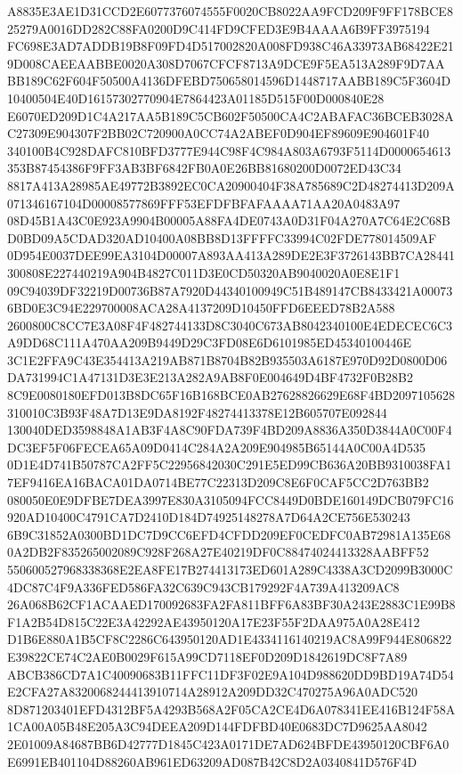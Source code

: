 \documentclass[UTF8,fontset=fandol,zihao=-4,a4paper]{ctexart}
\begin{document}
{{A8835E3AE1D31CCD2E6077376074555F0020CB8022AA9FCD209F9FF178BCE825279A0016DD282C88FA0200D9C414FD9CFED3E9B4AAAA6B9FF3975194
FC698E3AD7ADDB19B8F09FD4D517002820A008FD938C46A33973AB68422E219D008CAEEAABBE0020A308D7067CFCF8713A9DCE9F5EA513A289F9D7AA
BB189C62F604F50500A4136DFEBD750658014596D1448717AABB189C5F3604D10400504E40D16157302770904E7864423A01185D515F00D000840E28
E6070ED209D1C4A217AA5B189C5CB602F50500CA4C2ABAFAC36BCEB3028AC27309E904307F2BB02C720900A0CC74A2ABEF0D904EF89609E904601F40
340100B4C928DAFC810BFD3777E944C98F4C984A803A6793F5114D0000654613353B87454386F9FF3AB3BF6842FB0A0E26BB81680200D0072ED43C34
8817A413A28985AE49772B3892EC0CA20900404F38A785689C2D48274413D209A071346167104D00008577869FFF53EFDFBFAFAAAA71AA20A0483A97
08D45B1A43C0E923A9904B00005A88FA4DE0743A0D31F04A270A7C64E2C68BD0BD09A5CDAD320AD10400A08BB8D13FFFFC33994C02FDE778014509AF
0D954E0037DEE99EA3104D00007A893AA413A289DE2E3F3726143BB7CA28441300808E227440219A904B4827C011D3E0CD50320AB9040020A0E8E1F1
09C94039DF32219D00736B87A7920D44340100949C51B489147CB8433421A000736BD0E3C94E229700008ACA28A4137209D10450FFD6EEED78B2A588
2600800C8CC7E3A08F4F482744133D8C3040C673AB8042340100E4EDECEC6C3A9DD68C111A470AA209B9449D29C3FD08E6D6101985ED45340100446E
3C1E2FFA9C43E354413A219AB871B8704B82B935503A6187E970D92D0800D06DA731994C1A47131D3E3E213A282A9AB8F0E004649D4BF4732F0B28B2
8C9E0080180EFD013B8DC65F16B168BCE0AB27628826629E68F4BD2097105628310010C3B93F48A7D13E9DA8192F48274413378E12B605707E092844
130040DED3598848A1AB3F4A8C90FDA739F4BD209A8836A350D3844A0C00F4DC3EF5F06FECEA65A09D0414C284A2A209E904985B65144A0C00A4D535
0D1E4D741B50787CA2FF5C22956842030C291E5ED99CB636A20BB9310038FA17EF9416EA16BACA01DA0714BE77C22313D209C8E6F0CAF5CC2D763BB2
080050E0E9DFBE7DEA3997E830A3105094FCC8449D0BDE160149DCB079FC16920AD10400C4791CA7D2410D184D74925148278A7D64A2CE756E530243
6B9C31852A0300BD1DC7D9CC6EFD4CFDD209EF0CEDFC0AB72981A135E680A2DB2F835265002089C928F268A27E40219DF0C88474024413328AABFF52
550600527968338368E2EA8FE17B274413173ED601A289C4338A3CD2099B3000C4DC87C4F9A336FED586FA32C639C943CB179292F4A739A413209AC8
26A068B62CF1ACAAED170092683FA2FA811BFF6A83BF30A243E2883C1E99B8F1A2B54D815C22E3A42292AE43950120A17E23F55F2DAA975A0A28E412
D1B6E880A1B5CF8C2286C643950120AD1E4334116140219AC8A99F944E806822E39822CE74C2AE0B0029F615A99CD7118EF0D209D1842619DC8F7A89
ABCB386CD7A1C40090683B11FFC11DF3F02E9A104D988620DD9BD19A74D54E2CFA27A8320068244413910714A28912A209DD32C470275A96A0ADC520
8D871203401EFD4312BF5A4293B568A2F05CA2CE4D6A078341EE416B124F58A1CA00A05B48E205A3C94DEEA209D144FDFBD40E0683DC7D9625AA8042
2E01009A84687BB6D42777D1845C423A0171DE7AD624BFDE43950120CBF6A0E6991EB401104D88260AB961ED63209AD087B42C8D2A0340841D576F4D
}}
\end{document}
